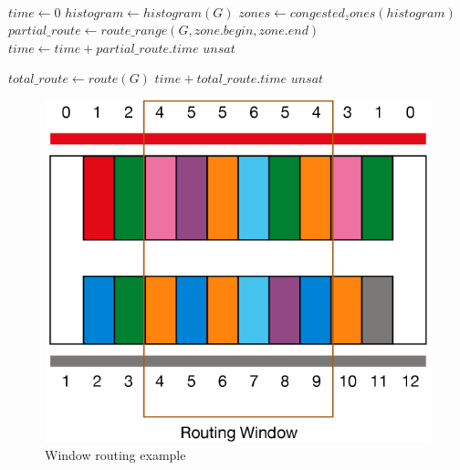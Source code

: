 \begin{description}
\small
\begin{algorithmic}
 \\
\State $time \gets 0$
\State $histogram \gets histogram(G)$
\State $zones \gets congested_zones(histogram)$ \\

	\State $partial\_route \gets route\_range(G, zone.begin, zone.end)$
		\State $time \gets time + partial\_route.time$
	\Else
		\State \Return $unsat$
	\EndIf
\EndFor

\State $total\_route \gets route(G)$
	\State \Return $time + total\_route.time$
\Else
	\State \Return $unsat$
\EndIf

\EndFunction
\end{algorithmic}    
\normalsize
\end{description}


\begin{figure}[h!]
  \centering
  \includegraphics[scale=0.5]{img/design/congestionwindow.png}
  \caption{Window routing example}
  \label{fig:congestionwindow}
\end{figure} 


